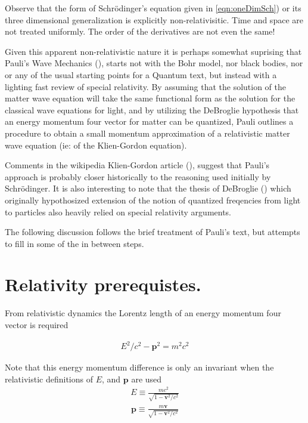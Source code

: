 \documentclass[]{eliblog}
\newcommand{\Bp}[0]{\mathbf{p}}
\newcommand{\Bv}[0]{\mathbf{v}}
\begin{document}
Observe that the form of Schr\"{o}dinger's equation given in  \ref{eqn:oneDimSch}) or its three dimensional generalization is explicitly non-relativisitic.  Time and space are not treated uniformly.  The order of the derivatives are not even the same!

Given this apparent non-relativistic nature it is perhaps somewhat suprising that Pauli's Wave Mechanics (\cite{pauli2000wm}), starts not with the Bohr model, nor black bodies, nor or any of the usual starting points for a Quantum text, but instead with a lighting fast review of special relativity.   By assuming that the solution of the matter wave equation will take the same functional form as the solution for the classical wave equations for light, and by utilizing the DeBroglie hypothesis that an energy momentum four vector for matter can be quantized, Pauli outlines a procedure to obtain a small momentum approximation of a relativistic matter wave equation (ie: of the Klien-Gordon equation).

Comments in the wikipedia Klien-Gordon article (\cite{wikiKG}), suggest that Pauli's approach is probably closer historically to the reasoning used initially by Schr\"{o}dinger.  It is also interesting to note that the thesis of DeBroglie (\cite{AFkracklauerDeBroglie}) which originally hypothosized extension of the notion of quantized freqencies from light to particles also heavily relied on special relativity arguments.

The following discussion follows the brief treatment of Pauli's text, but attempts to fill in some of the in between steps.

\section{Relativity prerequistes.}

From relativistic dynamics the Lorentz length of an energy momentum four vector is required

\begin{align}
E^2/c^2 - \Bp^2 = m^2 c^2
\end{align}

Note that this energy momentum difference is only an invariant when the relativistic definitions of $E$, and $\Bp$
are used
\begin{align}
E \equiv \frac{m c^2}{\sqrt{1 - \Bv^2/c^2}}
\end{align}
\begin{align}
\Bp \equiv \frac{m \Bv}{\sqrt{1 - \Bv^2/c^2}}
\end{align}
\end{document}
